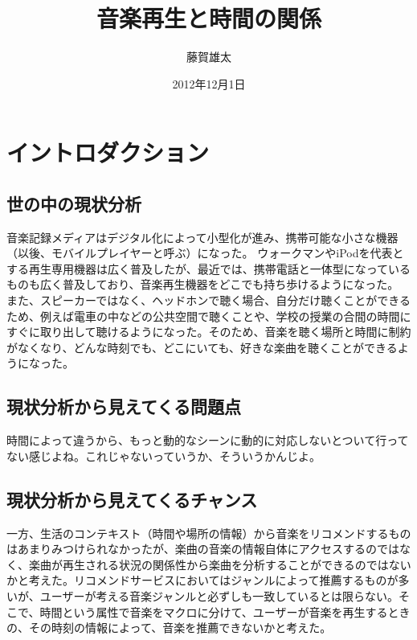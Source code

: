 \documentclass{jsarticle}
\begin{document}
\title{音楽再生と時間の関係}
\author{藤賀雄太}
\date{2012年12月1日}
\maketitle

\section{イントロダクション}
\subsection{世の中の現状分析}
音楽記録メディアはデジタル化によって小型化が進み、携帯可能な小さな機器（以後、モバイルプレイヤーと呼ぶ）になった。
ウォークマンやiPodを代表とする再生専用機器は広く普及したが、最近では、携帯電話と一体型になっているものも広く普及しており、音楽再生機器をどこでも持ち歩けるようになった。
また、スピーカーではなく、ヘッドホンで聴く場合、自分だけ聴くことができるため、例えば電車の中などの公共空間で聴くことや、学校の授業の合間の時間にすぐに取り出して聴けるようになった。そのため、音楽を聴く場所と時間に制約がなくなり、どんな時刻でも、どこにいても、好きな楽曲を聴くことができるようになった。

\subsection{現状分析から見えてくる問題点}
時間によって違うから、もっと動的なシーンに動的に対応しないとついて行ってない感じよね。これじゃないっていうか、そういうかんじよ。

\subsection{現状分析から見えてくるチャンス}
一方、生活のコンテキスト（時間や場所の情報）から音楽をリコメンドするものはあまりみつけられなかったが、楽曲の音楽の情報自体にアクセスするのではなく、楽曲が再生される状況の関係性から楽曲を分析することができるのではないかと考えた。リコメンドサービスにおいてはジャンルによって推薦するものが多いが、ユーザーが考える音楽ジャンルと必ずしも一致しているとは限らない。そこで、時間という属性で音楽をマクロに分けて、ユーザーが音楽を再生するときの、その時刻の情報によって、音楽を推薦できないかと考えた。
\end{document}
